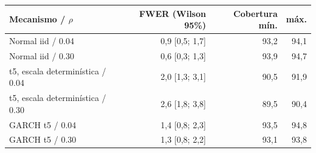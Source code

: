 \begin{tabular}{lrrr}
\toprule
Mecanismo / $\rho$ & FWER (Wilson 95\%) & Cobertura mín. & máx.\\
\midrule
Normal iid / 0.04 & 0,9 [0,5; 1,7] & 93,2 & 94,1\\
Normal iid / 0.30 & 0,6 [0,3; 1,3] & 93,9 & 94,7\\
t5, escala determinística / 0.04 & 2,0 [1,3; 3,1] & 90,5 & 91,9\\
t5, escala determinística / 0.30 & 2,6 [1,8; 3,8] & 89,5 & 90,4\\
GARCH t5 / 0.04 & 1,4 [0,8; 2,3] & 93,5 & 94,8\\
GARCH t5 / 0.30 & 1,3 [0,8; 2,2] & 93,1 & 93,8\\
\bottomrule
\end{tabular}

